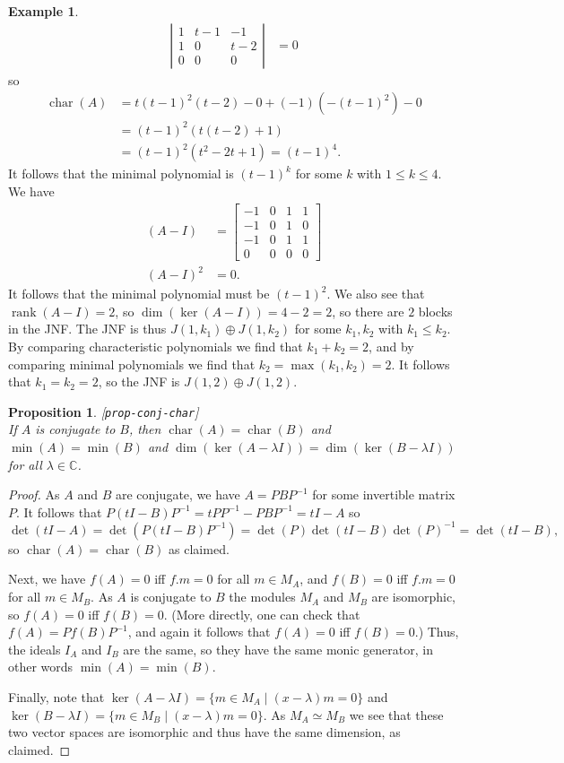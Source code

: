\documentclass{amsart}
\newcommand{\lbl}[1]{\label{#1}\textup{[\texttt{#1}]}\ \\}
\newcommand{\lbl}{\label}
\newcommand{\bbm}       {\left[\begin{matrix}}
\newcommand{\ebm}       {\end{matrix}\right]}
\newcommand{\chr}       {\operatorname{char}}
\newcommand{\rank}      {\operatorname{rank}}
\newcommand{\C}         {{\mathbb{C}}}
\newcommand{\lm}        {\lambda}
\newcommand{\st}        {\;|\;}
\newcommand{\op}        {\oplus}
\renewcommand{\:}{\colon}
\newtheorem{proposition}[theorem]{Proposition}
\theoremstyle{definition}
\newtheorem{example}[theorem]{Example}
\begin{document}
\begin{example}
\begin{align*}
    \left|\begin{array}{ccc}
     1&t-1&-1\\ 1&0&t-2 \\ 0&0&0 
    \end{array}\right| &= 0
 \end{align*}
 so 
 \begin{align*}
  \chr(A) &= t(t-1)^2(t-2) - 0 + (-1)(-(t-1)^2) - 0  \\
          &= (t-1)^2(t(t-2)+ 1) \\
          &= (t-1)^2(t^2-2t+1) = (t-1)^4.
 \end{align*}
 It follows that the minimal polynomial is $(t-1)^k$ for some $k$ with
 $1\leq k\leq 4$.  We have
 \begin{align*}
  (A-I) &= \bbm -1 & 0 & 1 & 1 \\
                -1 & 0 & 1 & 0 \\
                -1 & 0 & 1 & 1 \\
                 0 & 0 & 0 & 0 \ebm \\
  (A-I)^2 &= 0.
 \end{align*}
 It follows that the minimal polynomial must be $(t-1)^2$.  We also
 see that $\rank(A-I)=2$, so $\dim(\ker(A-I))=4-2=2$, so there are $2$
 blocks in the JNF.  The JNF is thus $J(1,k_1)\op J(1,k_2)$ for some
 $k_1,k_2$ with $k_1\leq k_2$.  By comparing characteristic
 polynomials we find that $k_1+k_2=2$, and by comparing minimal
 polynomials we find that $k_2=\max(k_1,k_2)=2$.  It follows that
 $k_1=k_2=2$, so the JNF is $J(1,2)\op J(1,2)$.
\end{example}

\begin{proposition}\lbl{prop-conj-char}
 If $A$ is conjugate to $B$, then $\chr(A)=\chr(B)$ and
 $\min(A)=\min(B)$ and $\dim(\ker(A-\lm I))=\dim(\ker(B-\lm I))$ for
 all $\lm\in\C$.
\end{proposition}
\begin{proof}
 As $A$ and $B$ are conjugate, we have $A=PBP^{-1}$ for some
 invertible matrix $P$.  It follows that
 $P(tI-B)P^{-1}=tPP^{-1}-PBP^{-1}=tI-A$ so 
 \[ \det(tI-A)=\det(P(tI-B)P^{-1})=
    \det(P)\det(tI-B)\det(P)^{-1}= \det(tI-B),
 \] 
 so $\chr(A)=\chr(B)$ as claimed. 

 Next, we have $f(A)=0$ iff $f.m=0$ for all $m\in M_A$, and $f(B)=0$
 iff $f.m=0$ for all $m\in M_B$.  As $A$ is conjugate to $B$ the
 modules $M_A$ and $M_B$ are isomorphic, so $f(A)=0$ iff $f(B)=0$.
 (More directly, one can check that $f(A)=Pf(B)P^{-1}$, and again it
 follows that $f(A)=0$ iff $f(B)=0$.)  Thus, the ideals $I_A$ and
 $I_B$ are the same, so they have the same monic generator, in other
 words $\min(A)=\min(B)$.

 Finally, note that $\ker(A-\lm I)=\{m\in M_A\st (x-\lm)m=0\}$ and
 $\ker(B-\lm I)=\{m\in M_B\st (x-\lm)m=0\}$.  As $M_A\simeq M_B$ we
 see that these two vector spaces are isomorphic and thus have the
 same dimension, as claimed.
\end{proof} 
\end{document}

